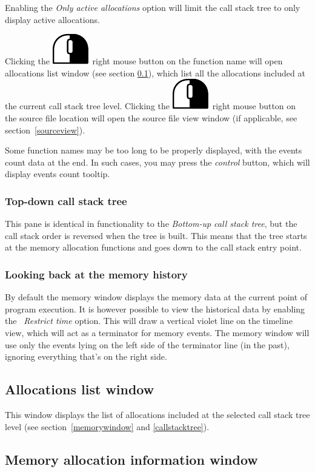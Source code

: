 \documentclass[hidelinks,titlepage,a4paper]{article}
\newcommand{\RMB}{\includegraphics[height=.8\baselineskip]{icons/rmb}}
\begin{document}
Enabling the \emph{Only active allocations} option will limit the call stack tree to only display active allocations.

Clicking the \RMB{}~right mouse button on the function name will open allocations list window (see section \ref{alloclist}), which list all the allocations included at the current call stack tree level. Clicking the \RMB{}~right mouse button on the source file location will open the source file view window (if applicable, see section~\ref{sourceview}).

Some function names may be too long to be properly displayed, with the events count data at the end. In such cases, you may press the \emph{control} button, which will display events count tooltip.

\subsubsection{Top-down call stack tree}

This pane is identical in functionality to the \emph{Bottom-up call stack tree}, but the call stack order is reversed when the tree is built. This means that the tree starts at the memory allocation functions and goes down to the call stack entry point.

\subsubsection{Looking back at the memory history}

By default the memory window displays the memory data at the current point of program execution. It is however possible to view the historical data by enabling the \emph{\faHistory{}~Restrict time} option. This will draw a vertical violet line on the timeline view, which will act as a terminator for memory events. The memory window will use only the events lying on the left side of the terminator line (in the past), ignoring everything that's on the right side.

\subsection{Allocations list window}
\label{alloclist}

This window displays the list of allocations included at the selected call stack tree level (see section~\ref{memorywindow} and \ref{callstacktree}).

\subsection{Memory allocation information window}
\label{memallocinfo}
\end{document}
